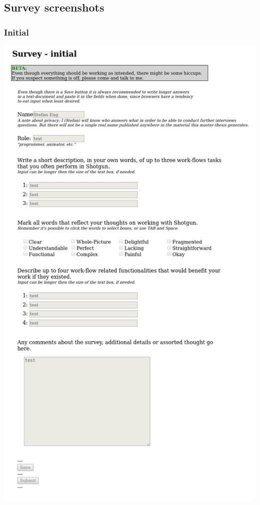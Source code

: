\subsection{Survey screenshots}
  \subsubsection{Initial}
    \includegraphics[width=\textwidth,trim={0cm 18cm 0cm 0cm},clip]{images/000_survey_initial.png}
